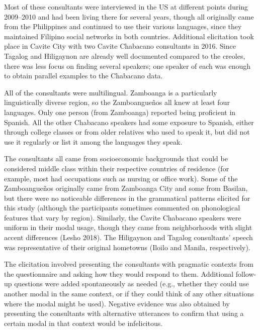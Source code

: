 \begin{styleStandard}
Most of these consultants were interviewed in the US at different points during 2009–2010 and had been living there for several years, though all originally came from the Philippines and continued to use their various languages, since they maintained Filipino social networks in both countries. Additional elicitation took place in Cavite City with two Cavite Chabacano consultants in 2016. Since Tagalog and Hiligaynon are already well documented compared to the creoles, there was less focus on finding several speakers; one speaker of each was enough to obtain parallel examples to the Chabacano data.
\end{styleStandard}

\begin{styleStandard}
All of the consultants were multilingual. Zamboanga is a particularly linguistically diverse region, so the Zamboangueños all knew at least four languages. Only one person (from Zamboanga) reported being proficient in Spanish. All the other Chabacano speakers had some exposure to Spanish, either through college classes or from older relatives who used to speak it, but did not use it regularly or list it among the languages they speak.
\end{styleStandard}

\begin{styleStandard}
The consultants all came from socioeconomic backgrounds that could be considered middle class within their respective countries of residence (for example, most had occupations such as nursing or office work). Some of the Zamboangueños originally came from Zamboanga City and some from Basilan, but there were no noticeable differences in the grammatical patterns elicited for this study (although the participants sometimes commented on phonological features that vary by region). Similarly, the Cavite Chabacano speakers were uniform in their modal usage, though they came from neighborhoods with slight accent differences (Lesho 2018). The Hiligaynon and Tagalog consultants’ speech was representative of their original hometowns (Iloilo and Manila, respectively).
\end{styleStandard}

\begin{styleStandard}
The elicitation involved presenting the consultants with pragmatic contexts from the questionnaire and asking how they would respond to them. Additional follow-up questions were added spontaneously as needed (e.g., whether they could use another modal in the same context, or if they could think of any other situations where the modal might be used). Negative evidence was also obtained by presenting the consultants with alternative utterances to confirm that using a certain modal in that context would be infelicitous. \ 
\end{styleStandard}

